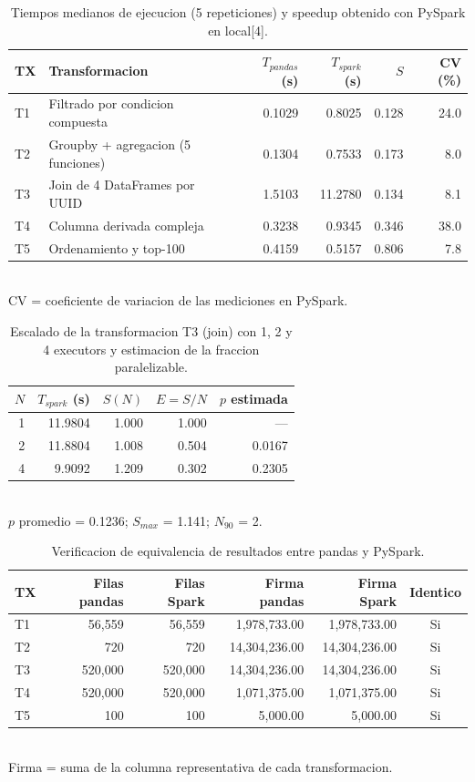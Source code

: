 \begin{table}[htbp]
\centering
\caption{Tiempos medianos de ejecucion (5 repeticiones) y speedup obtenido con PySpark en local[4].}
\label{tab:tiempos}
\small
\begin{tabular}{llrrrr}
\toprule
\textbf{TX} & \textbf{Transformacion} & $T_{pandas}$ (s) & $T_{spark}$ (s) & $S$ & CV (\%) \\
\midrule
T1 & Filtrado por condicion compuesta & 0.1029 & 0.8025 & 0.128 & 24.0 \\
T2 & Groupby + agregacion (5 funciones) & 0.1304 & 0.7533 & 0.173 & 8.0 \\
T3 & Join de 4 DataFrames por UUID & 1.5103 & 11.2780 & 0.134 & 8.1 \\
T4 & Columna derivada compleja & 0.3238 & 0.9345 & 0.346 & 38.0 \\
T5 & Ordenamiento y top-100 & 0.4159 & 0.5157 & 0.806 & 7.8 \\
\bottomrule
\end{tabular}
\\[2pt]\footnotesize CV = coeficiente de variacion de las mediciones en PySpark.
\end{table}

\begin{table}[htbp]
\centering
\caption{Escalado de la transformacion T3 (join) con 1, 2 y 4 executors y estimacion de la fraccion paralelizable.}
\label{tab:amdahl}
\small
\begin{tabular}{rrrrr}
\toprule
$N$ & $T_{spark}$ (s) & $S(N)$ & $E=S/N$ & $p$ estimada \\
\midrule
1 & 11.9804 & 1.000 & 1.000 & --- \\
2 & 11.8804 & 1.008 & 0.504 & 0.0167 \\
4 & 9.9092 & 1.209 & 0.302 & 0.2305 \\
\bottomrule
\end{tabular}
\\[2pt]\footnotesize $p$ promedio = 0.1236; $S_{max}$ = 1.141; $N_{90}$ = 2.
\end{table}

\begin{table}[htbp]
\centering
\caption{Verificacion de equivalencia de resultados entre pandas y PySpark.}
\label{tab:verificacion}
\small
\begin{tabular}{lrrrrc}
\toprule
\textbf{TX} & Filas pandas & Filas Spark & Firma pandas & Firma Spark & Identico \\
\midrule
T1 & 56,559 & 56,559 & 1,978,733.00 & 1,978,733.00 & Si \\
T2 & 720 & 720 & 14,304,236.00 & 14,304,236.00 & Si \\
T3 & 520,000 & 520,000 & 14,304,236.00 & 14,304,236.00 & Si \\
T4 & 520,000 & 520,000 & 1,071,375.00 & 1,071,375.00 & Si \\
T5 & 100 & 100 & 5,000.00 & 5,000.00 & Si \\
\bottomrule
\end{tabular}
\\[2pt]\footnotesize Firma = suma de la columna representativa de cada transformacion.
\end{table}

